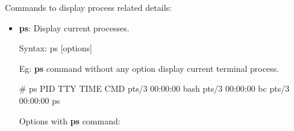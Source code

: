 \setlength{\columnsep}{3pt}
\begin{flushleft}
	Commands to display process related details:
	\begin{itemize}
		\item \textbf{ps}: Display current processes.
		\bigskip
		\begin{tcolorbox}[breakable,notitle,boxrule=-0pt,colback=pink,colframe=pink]
			\color{black}
			\font=9pt
			Syntax: ps [options]
			\font=4pt
		\end{tcolorbox}
		Eg: \textbf{ps} command without any option display current terminal process.
		\begin{tcolorbox}[breakable,notitle,boxrule=-0pt,colback=black,colframe=black]
			\color{green}
			\font=9pt
			\#  ps
			\color{white}
			\newline
			    PID TTY          TIME CMD
			 pts/3    00:00:00 bash
			 pts/3    00:00:00 bc
			 pts/3    00:00:00 ps
			\font=4pt
		\end{tcolorbox}
		
		Options with \textbf{ps} command:	
		

\end{itemize}
\end{flushleft}
